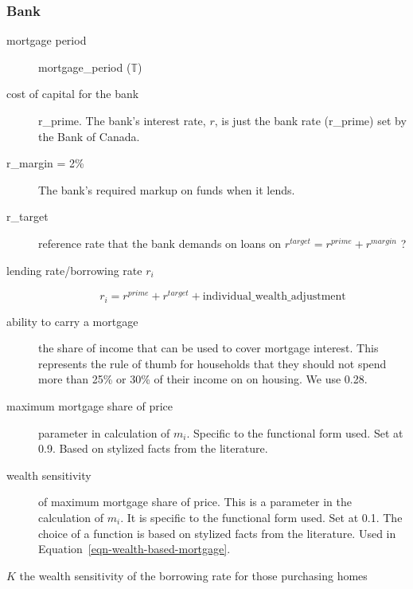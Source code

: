 \subsubsection{Bank} %
\begin{description}
\item [mortgage period]  mortgage\_period ($\mathbb{T}$)
\item [cost of capital for the bank] r\_prime. The bank's interest rate, $r$, is just the bank rate (r\_prime) set by the Bank of Canada.  

\item [r\_margin = 2\%] The bank's required markup on funds when it lends.  

\item [r\_target] reference rate that the bank demands on loans on 
$ r^{target}= r^{prime} +r^{margin}$ ? 

\item[lending rate/borrowing rate $r_i$]  
\[r_i=r^{prime} + r^{target} + \mathrm{individual\_wealth\_adjustment}\]

\item [{ability to carry a mortgage}] the share of income that can be used to cover mortgage interest. This represents the rule of thumb for households that they should not spend more than 25\% or 30\% of their income on on housing. We use 0.28.

\item [\gls{maximum mortgage share} of price] parameter in calculation of $m_i$. Specific to the functional form used. Set at 0.9. Based on stylized facts from the literature.  %
\item[wealth sensitivity] of maximum mortgage share of price. This is a parameter in the calculation of $m_i$. It is specific to the functional form used. Set at 0.1. The choice of a function is based on stylized facts from the literature.  %
Used in Equation~\ref{eqn-wealth-based-mortgage}.

\item [$K$ the wealth sensitivity of the borrowing rate for those purchasing homes]
\end{description}







